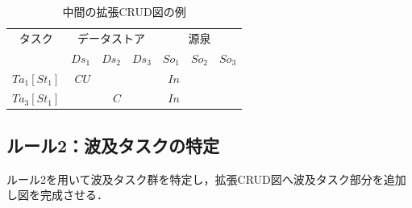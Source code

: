 \begin{table}[t]
  \centering
  \caption{中間の拡張CRUD図の例}
    \begin{tabular}{r|r|r|r|r|r|r}
    \multicolumn{1}{c|}{タスク} & \multicolumn{3}{c|}{データストア} & \multicolumn{3}{c}{源泉} \\
\cline{2-7}    \multicolumn{1}{c|}{} & $Ds_1$ & $Ds_2$ & $Ds_3$ & $So_1$ & $So_2$ & $So_3$ \\
    \hline
    \hline
    $Ta_1[St_1]$ & $CU$ &   &   & $In$ &   &  \\
    \hline
    $Ta_3[St_1]$ &   & $C$ &   & $In$ &   &  \\
    \hline
    \end{tabular}%
 \label{CRUDIO2}
\end{table}%



\subsection{ルール2：波及タスクの特定}
ルール2を用いて波及タスク群を特定し，拡張CRUD図へ波及タスク部分を追加し図を完成させる．

